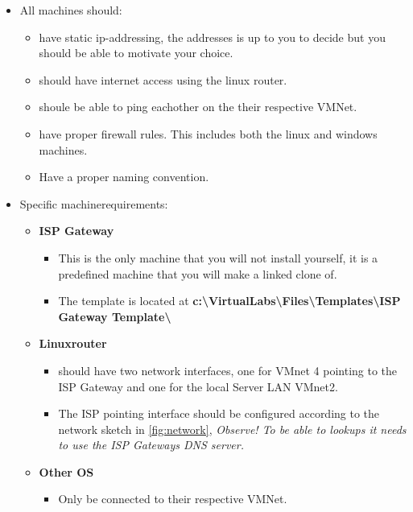 \documentclass[paper=a4, fontsize=11pt]{report} %
\begin{document}
\begin{itemize}
    \item All machines should:
    \begin{itemize}
        \item have static ip-addressing, the addresses is up to you to decide but you should be able to motivate your choice. 
	\item should have internet access using the linux router.
	\item shoule be able to ping eachother on the their respective VMNet.
        \item have proper firewall rules. This includes both the linux and windows machines.
    	\item Have a proper naming convention.
    \end{itemize}
	\item Specific machinerequirements:
    \begin{itemize}
        \item \textbf{ISP Gateway}
        \begin{itemize}
		\item This is the only machine that you will not install yourself, it is a predefined machine that you will make a linked clone of.
        	\item The template is located at \textbf{c:\textbackslash VirtualLabs\textbackslash Files\textbackslash Templates\textbackslash ISP Gateway Template\textbackslash }
        \end{itemize}

        \item \textbf{Linuxrouter}
        \begin{itemize}
		\item should have two network interfaces, one for VMnet 4 pointing to the ISP Gateway and one for the local Server LAN VMnet2.
            	\item The ISP pointing interface should be configured according to the network sketch in \figurename \ref{fig:network}, \textit{Observe! To be able to lookups it needs to use the ISP Gateways DNS server.}
        \end{itemize}
        
        \item \textbf{Other OS}
        \begin{itemize}
		\item Only be connected to their respective VMNet.
        \end{itemize}
        
    \end{itemize}
\end{itemize}
\end{document}
